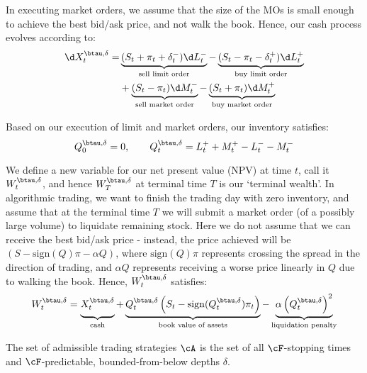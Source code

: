 \documentclass[12pt]{article}
\begin{document}
In executing market orders, we assume that the size of the MOs is small enough to achieve the best bid/ask price, and not walk the book. Hence, our cash process evolves according to:
\begin{equation}\label{eq:cashprocess}
\begin{split}
\d X^{\btau, \delta}_t = 	&\underbrace{(S_t + \pi_t + \delta^{-}_t) \d L^{-}_t}_{\text{sell limit order}} - \underbrace{(S_t - \pi_t - \delta^{+}_t) \d L^{+}_t}_{\text{buy limit order}} \\
						&+ \underbrace{(S_t - \pi_t) \d M^{-}_t}_{\text{sell market order}} - \underbrace{(S_t + \pi_t) \d M^{+}_t}_{\text{buy market order}}
\end{split}
\end{equation}

Based on our execution of limit and market orders, our inventory satisfies:
\begin{equation}\label{eq:inventory}
Q^{\btau, \delta}_0 = 0, \qquad Q^{\btau, \delta}_t = L^+_t + M^+_t - L^-_t - M^-_t
\end{equation}

We define a new variable for our net present value (NPV) at time $t$, call it $W^{\btau, \delta}_t$, and hence $W^{\btau, \delta}_T$ at terminal time $T$ is our `terminal wealth'. In algorithmic trading, we want to finish the trading day with zero inventory, and assume that at the terminal time $T$ we will submit a market order (of a possibly large volume) to liquidate remaining stock. Here we do not assume that we can receive the best bid/ask price - instead, the price achieved will be $(S - \mathrm{sign}(Q)\pi - \alpha Q)$, where $\mathrm{sign}(Q)\pi$ represents crossing the spread in the direction of trading, and $\alpha Q$ represents receiving a worse price linearly in $Q$ due to walking the book. Hence, $W^{\btau, \delta}_t$ satisfies:
\begin{equation}
\label{eq:terminalwealth}
W^{\btau, \delta}_t = \underbrace{\vphantom{\left( Q^{\btau, \delta}_t) \right)}X^{\btau, \delta}_t}_{\text{cash}}+ \underbrace{Q^{\btau, \delta}_t \left( S_t - \mathrm{sign}(Q^{\btau, \delta}_t)\pi_t \right)}_{\text{book value of assets}} - \underbrace{\alpha \left( Q^{\btau, \delta}_t \right)^2}_{\text{liquidation penalty}}
\end{equation}

The set of admissible trading strategies $\cA$ is the set of all $\cF$-stopping times and $\cF$-predictable, bounded-from-below depths $\delta$. 
\end{document}
